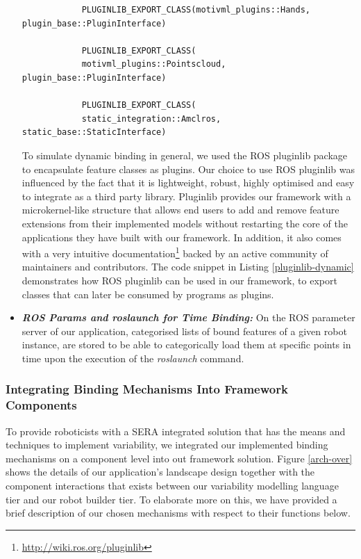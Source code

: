 \documentclass[conference]{IEEEtran}
\newcommand{\foot}[1]{\footnote{\url{#1}}}
\begin{document}
\begin{itemize}
\begin{listing}[H]
\begin{verbatim}
			PLUGINLIB_EXPORT_CLASS(motivml_plugins::Hands, plugin_base::PluginInterface)
			
			PLUGINLIB_EXPORT_CLASS(
			motivml_plugins::Pointscloud, plugin_base::PluginInterface)
			
			PLUGINLIB_EXPORT_CLASS(
			static_integration::Amclros, static_base::StaticInterface)
		\end{verbatim}
		\label{pluginlib-dynamic}
	\end{listing}

To simulate dynamic binding in general, we used the ROS pluginlib package to encapsulate feature classes as plugins. Our choice to use ROS pluginlib was influenced by the fact that it is lightweight, robust, highly optimised and easy to integrate as a third party library. Pluginlib provides our framework with a microkernel-like structure that allows end users to add and remove feature extensions from their implemented models without restarting the core of the applications they have built with our framework. In addition, it also comes with a very intuitive documentation\foot{http://wiki.ros.org/pluginlib} backed by an active community of maintainers and contributors. The code snippet in Listing \ref{pluginlib-dynamic} demonstrates how ROS pluginlib can be used in our framework, to export classes that can later be consumed by programs as plugins.\\

\item \textit{\textbf{ROS Params and roslaunch for Time Binding:}} On the ROS parameter server of our application, categorised lists of bound features of a given robot instance, are stored to be able to categorically load them at specific points in time upon the execution of the \textit{roslaunch} command.
\end{itemize}
\subsubsection{Integrating Binding Mechanisms Into Framework Components}
To provide roboticists with a SERA integrated solution that has the means
and techniques to implement variability, we integrated our implemented binding mechanisms on a component level into out framework solution.  Figure \ref{arch-over} shows the details of our application's landscape design together with the component interactions that exists between our variability modelling language tier and our robot builder tier. To elaborate more on this, we have provided a brief description of our chosen mechanisms with respect to their functions below.
\end{document}
